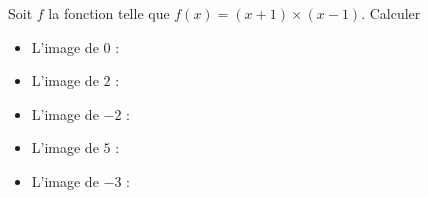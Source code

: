 \documentclass{beamer}
\begin{document}
\begin{frame}
	Soit $f$ la fonction telle que $f(x) = (x + 1) × (x - 1)$. Calculer
	\begin{itemize}
		\item L'image de $0$ :
		\item L'image de $2$ :
		\item L'image de $-2$ :
		\item L'image de $5$ :
		\item L'image de $-3$ :
	\end{itemize}
\end{frame}
\end{document}
